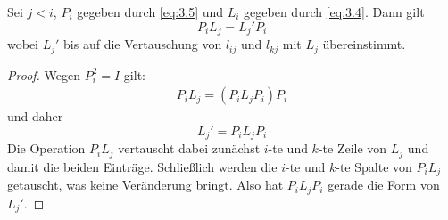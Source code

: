 \documentclass[a4paper]{scrartcl}
\numberwithin{equation}{section}
\begin{document}
\setcounter{thm}{6}
\begin{lem}
\label{lem:3.7}
Sei $j<i$, $P_i$ gegeben durch \eqref{eq:3.5} und $L_i$ gegeben durch \eqref{eq:3.4}.
Dann gilt
\[
P_iL_j = L_j'P_i
\]
wobei $L_j'$ bis auf die Vertauschung von $l_{ij}$ und $l_{kj}$ mit $L_j$ übereinstimmt.

\begin{proof}
Wegen $P_i^2=I$ gilt:
\begin{align*}
P_iL_j = (P_iL_jP_i)P_i
\end{align*}
und daher
\[
L_j' = P_iL_jP_i
\]
Die Operation $P_iL_j$ vertauscht dabei zunächst $i$-te und $k$-te Zeile von $L_j$ und damit die beiden Einträge.
Schließlich werden die $i$-te und $k$-te Spalte von $P_iL_j$ getauscht, was keine Veränderung bringt.
Also hat $P_iL_jP_i$ gerade die Form von $L_j'$.
\end{proof}
\end{lem}
\end{document}
